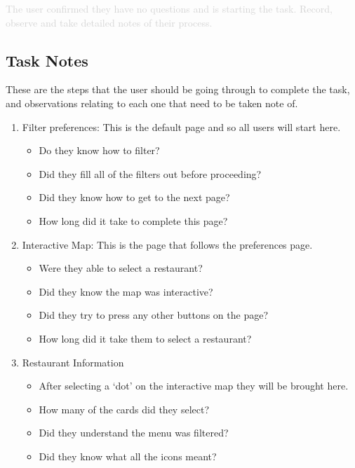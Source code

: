 \documentclass[a4 paper, 10pt]{article}
\begin{document}
        \textcolor{lightgray}{The user confirmed they have no questions and is starting the task.  Record, observe and take detailed notes of their process.}

    \subsection*{Task Notes}
        These are the steps that the user should be going through to complete the task, and observations relating to each one that need to be taken note of.
        \begin{enumerate}
            \item Filter preferences: 
            This is the default page and so all users will start here.
                \begin{itemize}
                    \item Do they know how to filter?
                    \item Did they fill all of the filters out before proceeding?
                    \item Did they know how to get to the next page?
                    \item How long did it take to complete this page?
                \end{itemize} 
            \item Interactive Map:
            This is the page that follows the preferences page.
                \begin{itemize}
                    \item Were they able to select a restaurant?
                    \item Did they know the map was interactive?
                    \item Did they try to press any other buttons on the page?
                    \item How long did it take them to select a restaurant?
                \end{itemize}
            \item Restaurant Information
                \begin{itemize}
                    \item After selecting a ‘dot’ on the interactive map they will be brought here. 
                    \item How many of the cards did they select?
                    \item Did they understand the menu was filtered?
                    \item Did they know what all the icons meant?

\end{itemize}
\end{enumerate}
\end{document}
